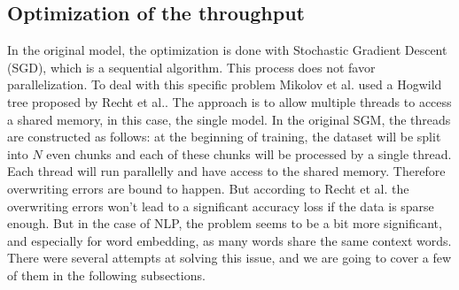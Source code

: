 \subsection{Optimization of the throughput}

In the original model, the optimization is done with Stochastic Gradient Descent (SGD), which is a sequential algorithm. This process does not favor parallelization. To deal with this specific problem Mikolov et al.\cite{mikolov2} used a Hogwild tree proposed by Recht et al.\cite{hogwild}. The approach is to allow multiple threads to access a shared memory, in this case, the single model. In the original SGM, the threads are constructed as follows: at the beginning of training, the dataset will be split into $N$ even chunks and each of these chunks will be processed by a single thread. Each thread will run parallelly and have access to the shared memory. Therefore overwriting errors are bound to happen. But according to Recht et al.\cite{hogwild} the overwriting errors won't lead to a significant accuracy loss if the data is sparse enough. But in the case of NLP, the problem seems to be a bit more significant, and especially for word embedding, as many words share the same context words. There were several attempts at solving this issue, and we are going to cover a few of them in the following subsections. 

